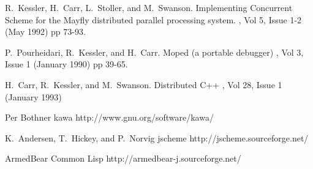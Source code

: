 \documentclass{acm-final/sig-alternate-modified}
\begin{document}
\begin{thebibliography}{1}

R.~Kessler, H.~Carr, L.~Stoller, and M.~Swanson.
\newblock Implementing Concurrent Scheme for the Mayfly distributed parallel processing system.
, Vol 5, Issue 1-2 (May 1992) pp 73-93.

P.~Pourheidari, R.~Kessler, and H.~Carr.
\newblock Moped (a portable debugger)
, Vol 3, Issue 1 (January 1990) pp 39-65.

H.~Carr, R.~Kessler, and M.~Swanson.
\newblock Distributed C++
, Vol 28, Issue 1 (January 1993)

Per Bothner
\newblock kawa
\newblock http://www.gnu.org/software/kawa/

K.~Andersen, T.~Hickey, and P.~Norvig
\newblock jscheme
\newblock http://jscheme.sourceforge.net/

\newblock ArmedBear Common Lisp
\newblock http://armedbear-j.sourceforge.net/


\end{thebibliography}
\end{document}
